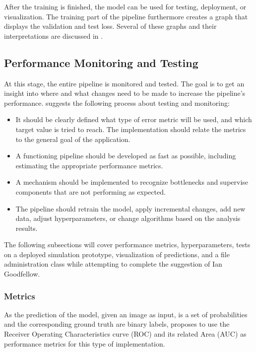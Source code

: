 After the training is finished, the model can be used for testing, deployment, or visualization. The training part of the pipeline furthermore creates a graph that displays the validation and test loss. Several of these graphs and their interpretations are discussed in .
\newpage

\subsection{Performance Monitoring and Testing \label{monitoring} }
At this stage, the entire pipeline is monitored and tested. The goal is to get an insight into where and what changes need to be made to increase the pipeline's performance. \cite{ Goodfellow-et-al-2016} suggests the following process about testing and monitoring:

\begin{itemize}
\item It should be clearly defined what type of error metric will be used, and which target value is tried to reach. The implementation should relate the metrics to the general goal of the application.

\item A functioning pipeline should be developed as fast as possible, including estimating the appropriate performance metrics.

\item A mechanism should be implemented to recognize bottlenecks and supervise components that are not performing as expected.

\item The pipeline should retrain the model, apply incremental changes, add new data, adjust hyperparameters, or change algorithms based on the analysis results.
\end{itemize}

The following subsections will cover performance metrics, hyperparameters, tests on a deployed simulation prototype, visualization of predictions, and a file administration class while attempting to complete the suggestion of Ian Goodfellow.

\subsubsection{Metrics \label{metrics} }
As the prediction of the model, given an image as input, is a set of probabilities and the corresponding ground truth are binary labels, \cite{nava2019learning} proposes to use the Receiver Operating Characteristics curve (ROC) and its related Area (AUC) as performance metrics for this type of implementation.\\ 

